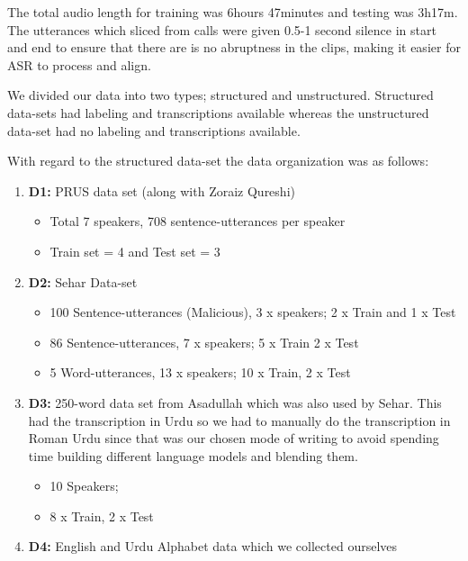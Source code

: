  
The total audio length for training was 6hours 47minutes and testing was 3h17m. The utterances which sliced from calls were given 0.5-1 second silence in start and end to ensure that there are is no abruptness in the clips, making it easier for ASR to process and align. 

We divided our data into two types; structured and unstructured. Structured data-sets had labeling and transcriptions available whereas the unstructured data-set had no labeling and transcriptions available. 

With regard to the structured data-set the data organization was as follows:
\begin{enumerate}
    \item \textbf{D1:} PRUS \cite{zia_pronouncur_2018} data set (along with Zoraiz Qureshi) 
    \begin{itemize}
        \item Total 7 speakers, 708 sentence-utterances per speaker
        \item Train set = 4 and Test set = 3
    \end{itemize}
    \item \textbf{D2:} Sehar Data-set \cite{sehar_gul_detecting_2020} 
    \begin{itemize}
        \item 100 Sentence-utterances (Malicious), 3 x speakers; 2 x Train and 1 x Test
        \item 86 Sentence-utterances, 7 x speakers; 5 x Train 2 x Test
        \item 5 Word-utterances, 13 x speakers; 10 x Train, 2 x Test
    \end{itemize}
    \item \textbf{D3:} 250-word data set from Asadullah \cite{asadullah_automatic_2016} \cite{noauthor_urdu_nodate} which was also used by Sehar. This had the transcription in Urdu so we had to manually do the transcription in Roman Urdu since that was our chosen mode of writing to avoid spending time building different language models and blending them.    \begin{itemize}
        \item 10 Speakers;
        \item 8 x Train, 2 x Test
    \end{itemize}
    \item \textbf{D4:} English and Urdu Alphabet data which we collected ourselves  

\end{enumerate}
